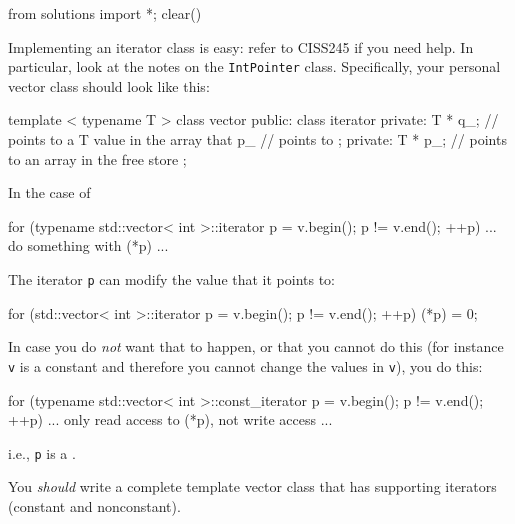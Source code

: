 \begin{python0}
from solutions import *; clear()
\end{python0}

Implementing an iterator class is easy: refer to CISS245 if you need help.
In particular, look at the notes on the \verb!IntPointer! class.
Specifically, your personal vector class should look like this:
\begin{console}[frame=single,fontsize=\footnotesize]
template < typename T >
class vector
{
public:
    class iterator
    {
    private:
        T * q_; // points to a T value in the array that p_
                // points to
    };
private:
    T * p_; // points to an array in the free store
};
\end{console}

In the case of
\begin{console}[fontsize=\footnotesize]
for (typename std::vector< int >::iterator p = v.begin();
     p != v.end(); ++p)
{
     ... do something with (*p) ...
}
\end{console}
The iterator \verb!p! can modify the value that it points to:
\begin{console}[fontsize=\footnotesize]
for (std::vector< int >::iterator p = v.begin();
     p != v.end(); ++p)
{
     (*p) = 0;
}
\end{console}
In case you do \textit{not} want that to happen, or that you cannot do this
(for instance \verb!v! is a constant and therefore you cannot
change the values in \verb!v!), you do this:
\begin{console}[fontsize=\footnotesize]
for (typename std::vector< int >::const_iterator p = v.begin();
     p != v.end(); ++p)
{
     ... only read access to (*p), not write access ...
}
\end{console}
i.e., \verb!p! is a .





You \textit{should} write a complete
template vector class that has supporting
iterators (constant and nonconstant).
